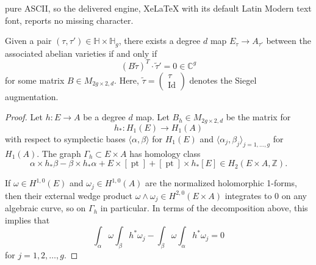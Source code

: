 \documentclass[10pt,a4paper]{amsart}
\DeclareMathOperator{\Id}{Id}
\DeclareMathOperator{\pt}{pt}
\def\bC{\mathbb{C}}
\def\bH{\mathbb{H}}
\def\bZ{\mathbb{Z}}
\begin{document}
pure ASCII, so the delivered engine, XeLaTeX with its default Latin Modern text font, reports no missing character.
\begin{lem}\label{lem:B_vanishing}
Given a pair $(\tau,\tau')\in \bH\times \bH_g$, there exists a degree $d$ map $E_\tau \to A_{\tau'}$ between the associated abelian varieties if and only if 
\begin{equation*}
    (B \tilde{\tau})^T\cdot \tilde{\tau}'=0\in\bC^g
\end{equation*}
for some matrix $B\in M_{2g\times 2,d}$. Here, $\tilde{\tau} = \begin{pmatrix} \tau \\ \Id \end{pmatrix}$ denotes the Siegel augmentation.
\end{lem}

\begin{proof}
Let $h: E \to A$ be a degree $d$ map. Let $B_h\in M_{2g\times 2,d}$ be the matrix for 
$$h_*:H_1(E) \to H_1(A)$$
with respect to symplectic bases $\langle\alpha,\beta\rangle$ for $H_1(E)$ and $\langle\alpha_j,\beta_j\rangle_{j=1,\ldots,g}$ for $H_1(A)$. The graph $\Gamma_h \subset E \times A$ has homology class
\begin{equation*}
\alpha\times h_*\beta - \beta\times h_*\alpha + E\times [\pt] + [\pt]\times h_*[E]\in H_2(E\times A,\bZ).
\end{equation*}

If $\omega\in H^{1,0}(E)$ and $\omega_j\in H^{1,0}(A)$ are the normalized holomorphic 1-forms, then their external wedge product $\omega \wedge \omega_j\in H^{2,0}(E\times A)$ integrates to 0 on any algebraic curve, so on $\Gamma_h$ in particular. In terms of the decomposition above, this implies that
\begin{equation*}
\int_\alpha \omega \int_\beta h^*\omega_j - \int_\beta \omega \int_\alpha h^*\omega_j=0
\end{equation*}
for $j=1,2,\dots,g$. 


\end{proof}
\end{document}
